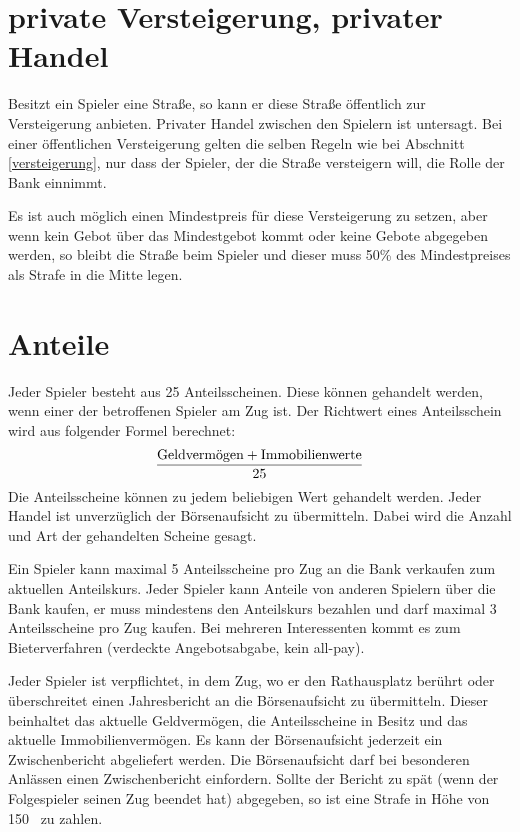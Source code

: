 \documentclass{article}
\begin{document}
	\section{private Versteigerung, privater Handel}
	Besitzt ein Spieler eine Straße, so kann er diese Straße öffentlich zur Versteigerung anbieten. Privater Handel zwischen den Spielern ist untersagt. Bei einer öffentlichen Versteigerung gelten die selben Regeln wie bei Abschnitt \ref{versteigerung}, nur dass der Spieler, der die Straße versteigern will, die Rolle der Bank einnimmt.
	
	Es ist auch möglich einen Mindestpreis für diese Versteigerung zu setzen, aber wenn kein Gebot über das Mindestgebot kommt oder keine Gebote abgegeben werden, so bleibt die Straße beim Spieler und dieser muss 50\% des Mindestpreises als Strafe in die Mitte legen.
	
	\section{Anteile}
	
	Jeder Spieler besteht aus 25 Anteilsscheinen. Diese können gehandelt werden, wenn einer der betroffenen Spieler am Zug ist. Der Richtwert eines Anteilsschein wird aus folgender Formel berechnet: 
	\begin{align}
		\frac{\text{Geldvermögen} + \text{Immobilienwerte}}{25} \notag
	\end{align}
	Die Anteilsscheine können zu jedem beliebigen Wert gehandelt werden. Jeder Handel ist unverzüglich der Börsenaufsicht zu übermitteln. Dabei wird die Anzahl und Art der gehandelten Scheine gesagt.
	
	Ein Spieler kann maximal 5 Anteilsscheine pro Zug an die Bank verkaufen zum aktuellen Anteilskurs. Jeder Spieler kann Anteile von anderen Spielern über die Bank kaufen, er muss mindestens den Anteilskurs bezahlen und darf maximal 3 Anteilsscheine pro Zug kaufen. Bei mehreren Interessenten kommt es zum Bieterverfahren (verdeckte Angebotsabgabe, kein all-pay).
	
	Jeder Spieler ist verpflichtet, in dem Zug, wo er den Rathausplatz berührt oder überschreitet einen Jahresbericht an die Börsenaufsicht zu übermitteln. Dieser beinhaltet das aktuelle Geldvermögen, die Anteilsscheine in Besitz und das aktuelle Immobilienvermögen. Es kann der Börsenaufsicht jederzeit ein Zwischenbericht abgeliefert werden. Die Börsenaufsicht darf bei besonderen Anlässen einen Zwischenbericht einfordern. Sollte der Bericht zu spät (wenn der Folgespieler seinen Zug beendet hat) abgegeben, so ist eine Strafe in Höhe von 150 \EUR\, zu zahlen.
	
\end{document}
